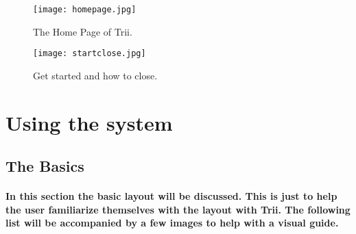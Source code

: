 \documentclass[12pt]{article}
\begin{document}
\begin{figure}
  \texttt{[image: homepage.jpg]}
  \caption{The Home Page of Trii.}
  \label{fig:homepage}
\end{figure}

\begin{figure}
  \texttt{[image: startclose.jpg]}
  \caption{Get started and how to close.}
  \label{fig:startclose}
\end{figure}

\newpage
\section{Using the system}
\subsection{The Basics}
\paragraph{In this section the basic layout will be discussed. This is just to help the user familiarize themselves with the layout with Trii. The following list will be accompanied by a few images to help with a visual guide.}
\end{document}
